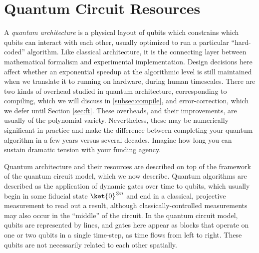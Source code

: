 \section{Quantum Circuit Resources}
\label{sec:circuit}

A \emph{quantum architecture} is a physical layout of qubits which constrains
which qubits can interact with each other, usually optimized to run a particular
``hard-coded'' algorithm. Like classical architecture, it is the
connecting layer between mathematical formalism and experimental implementation.
Design decisions here affect whether an exponential speedup at the
algorithmic level is still maintained when we translate it to running on
hardware, during human timescales. There are two kinds of overhead studied in quantum architecture,
corresponding to compiling, which we will discuss in \ref{subsec:compile},
and error-correction, which we defer until Section \ref{sec:ft}. These
overheads, and their improvements, are usually of the polynomial variety.
Nevertheless, these may be numerically significant in practice and make the
difference between completing your quantum algorithm in a few years versus
several decades. Imagine how long you can sustain dramatic tension with
your funding agency.

Quantum architecture and their resources are described on top of the framework of
the quantum circuit model, which we now describe. Quantum algorithms are described as
the application of dynamic gates over time to
qubits, which usually begin in some
fiducial state $\ket{0}^{\otimes n}$ and end in a classical, projective measurement
to read out a result, although classically-controlled measurements may also
occur in the ``middle'' of the circuit.
In the quantum circuit model, qubits are represented by lines,
and gates here appear as blocks that operate on one or two qubits in a single
time-step, as time flows from left to right. These qubits are not necessarily
related to each other spatially.


